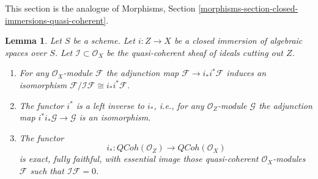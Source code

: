 \documentclass{stacks-project}
\theoremstyle{plain}
\newtheorem{lemma}[subsection]{Lemma}
\theoremstyle{definition}
\theoremstyle{remark}
\numberwithin{equation}{subsection}
\def\QCoh{\mathit{QCoh}}
\begin{document}
\noindent
This section is the analogue of
Morphisms, Section \ref{morphisms-section-closed-immersions-quasi-coherent}.

\begin{lemma}
\label{lemma-i-star-equivalence}
Let $S$ be a scheme. Let $i : Z \to X$ be a closed immersion of algebraic
spaces over $S$. Let $\mathcal{I} \subset \mathcal{O}_X$ be the quasi-coherent
sheaf of ideals cutting out $Z$.
\begin{enumerate}
\item For any $\mathcal{O}_X$-module $\mathcal{F}$ the adjunction map
$\mathcal{F} \to i_*i^*\mathcal{F}$ induces an isomorphism
$\mathcal{F}/\mathcal{I}\mathcal{F} \cong i_*i^*\mathcal{F}$.
\item The functor $i^*$ is a left inverse to $i_*$, i.e., for any
$\mathcal{O}_Z$-module $\mathcal{G}$ the adjunction map
$i^*i_*\mathcal{G} \to \mathcal{G}$ is an isomorphism.
\item The functor
$$
i_* :
\QCoh(\mathcal{O}_Z)
\longrightarrow
\QCoh(\mathcal{O}_X)
$$
is exact, fully faithful, with essential image those quasi-coherent
$\mathcal{O}_X$-modules $\mathcal{F}$ such that $\mathcal{I}\mathcal{F} = 0$.
\end{enumerate}
\end{lemma}
\end{document}
